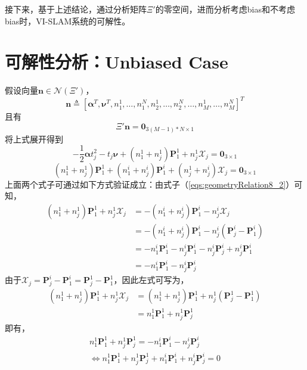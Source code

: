 \documentclass{article}
\begin{document}
\par
接下来，基于上述结论，通过分析矩阵$\Xi'$的零空间，进而分析考虑bias和不考虑bias时，VI-SLAM系统的可解性。

\section{可解性分析：Unbiased Case}
假设向量$\textbf{n}\in\mathcal{N}(\Xi')$，
\begin{equation}
    \textbf{n}\triangleq \left[\mathbf{\alpha}^T,\mathbf{\nu}^T,n_1^1,\dots,n_1^N,
    n_2^1,\dots,n_2^N,\dots,n_M^1,\dots,n_M^N\right]^T
\end{equation}
且有
\begin{equation}\label{eqs:geometryRelation8}
    \Xi'\textbf{n}=\textbf{0}_{3(M-1)*N\times 1}
\end{equation}
将上式展开得到
\begin{equation}\label{eqs:geometryRelation8_1}
    -\frac{1}{2}\mathbf{\alpha}t_j^2-t_j\mathbf{\nu}+(n_1^1+n_j^1)\textbf{P}_1^1+n_j^1\mathcal{X}_j=\textbf{0}_{3\times 1}
\end{equation}
\begin{equation}\label{eqs:geometryRelation8_2}
    (n_1^1+n_j^1)\textbf{P}_1^1+(n_1^i+n_j^i)\textbf{P}_1^i+(n_j^1+n_j^i)\mathcal{X}_j=\textbf{0}_{3\times 1}
\end{equation}
上面两个式子可通过如下方式验证成立：由式子（\ref{eqs:geometryRelation8_2}）可知，
\begin{equation}
    \begin{array}{ll}
    (n_1^1+n_j^1)\textbf{P}_1^1+n_j^1\mathcal{X}_j
    &=-(n_1^i+n_j^i)\textbf{P}_1^i-n_j^i\mathcal{X}_j\\
    &=-(n_1^i+n_j^i)\textbf{P}_1^i-n_j^i(\textbf{P}_j^i-\textbf{P}_1^i)\\
    &=-n_1^i\textbf{P}_1^i-n_j^i\textbf{P}_1^i-n_j^i\textbf{P}_j^i+n_j^i\textbf{P}_1^i\\
    &=-n_1^i\textbf{P}_1^i-n_j^i\textbf{P}_j^i
    \end{array}
\end{equation}
由于$\mathcal{X}_j=\textbf{P}_j^i-\textbf{P}_1^i=\textbf{P}_j^1-\textbf{P}_1^1$，因此左式可写为，
\begin{equation}
    \begin{array}{ll}
    (n_1^1+n_j^1)\textbf{P}_1^1+n_j^1\mathcal{X}_j
    &=(n_1^1+n_j^1)\textbf{P}_1^1+n_j^1(\textbf{P}_j^1-\textbf{P}_1^1)\\
    &=n_1^1\textbf{P}_1^1+n_j^1\textbf{P}_j^1
    \end{array}
\end{equation}
即有，
\begin{equation}
    \begin{array}{c}
    n_1^1\textbf{P}_1^1+n_j^1\textbf{P}_j^1=-n_1^i\textbf{P}_1^i-n_j^i\textbf{P}_j^i\\
    \Leftrightarrow
    n_1^1\textbf{P}_1^1+n_j^1\textbf{P}_j^1+n_1^i\textbf{P}_1^i+n_j^i\textbf{P}_j^i=0
    \end{array}
\end{equation}
\end{document}
